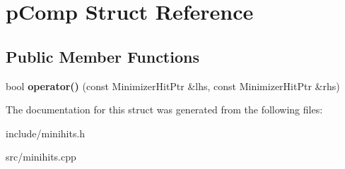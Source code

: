 \hypertarget{structpComp}{}\section{p\+Comp Struct Reference}
\label{structpComp}
\subsection*{Public Member Functions}
\begin{DoxyCompactItemize}
\item 
\mbox{\label{structpComp_ae587ce6fb6b5bf3595f9c00934628f8e}} 
bool {\bfseries operator()} (const Minimizer\+Hit\+Ptr \&lhs, const Minimizer\+Hit\+Ptr \&rhs)
\end{DoxyCompactItemize}


The documentation for this struct was generated from the following files\+:\begin{DoxyCompactItemize}
\item 
include/minihits.\+h\item 
src/minihits.\+cpp\end{DoxyCompactItemize}
